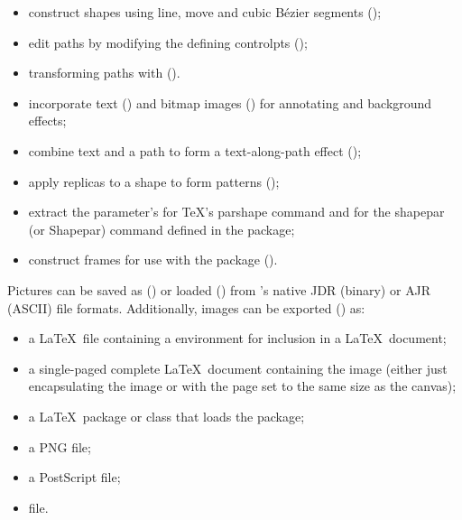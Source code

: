 \begin{itemize}
  \item construct shapes using line, move and cubic Bézier segments
();

  \item edit paths by modifying the defining \glspl{controlpt}
  ();

  \item transforming paths with  ().

  \item incorporate text () and 
  bitmap images ()
  for annotating and background effects;

  \item combine text and a path to form a text-along-path
  effect ();

  \item apply replicas to a shape to form patterns
  ();

  \item extract the parameter's for \TeX's \gls{parshape} command and for 
  the \gls{shapepar} (or \gls{Shapepar}) command defined in the
   package;

  \item construct frames for use with the  package
  ().
\end{itemize}

Pictures can be saved as () or loaded
() from \FlowframTk's native \gls{JDR}
(binary) or \gls{AJR} (ASCII) file formats. Additionally, images can be
exported () as:

\begin{itemize}
    \item a \LaTeX\ file containing a  environment
    for inclusion in a \LaTeX\ document;

    \item a single-paged complete \LaTeX\ document containing the image
    (either just encapsulating the image or with the page set to the
    same size as the \gls{canvas});

    \item a \LaTeX\ package or class that loads the  package;

    \item a PNG file;

    \item a PostScript file;

    \item {} file.
\end{itemize}

